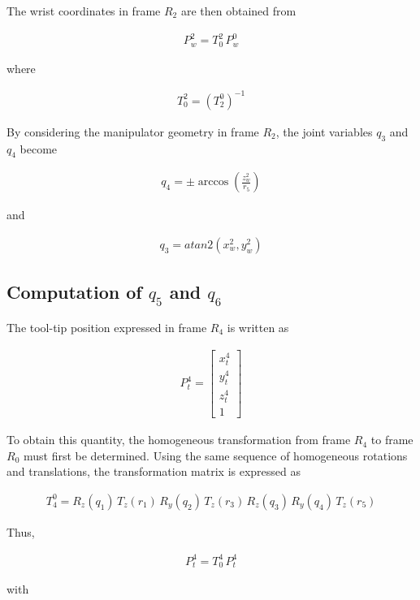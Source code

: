 \documentclass[12pt, a4paper]{article}
\begin{document}
The wrist coordinates in frame \(R_2\) are then obtained from

\begin{align}
P_w^{2} = T_{0}^{2}\,P_w^{0}
\end{align}

where

\begin{align}
T_{0}^{2} = (T_{2}^{0})^{-1}
\end{align}

By considering the manipulator geometry in frame \(R_2\), the joint variables \(q_3\) and \(q_4\) become

\begin{align}
q_4 = \pm \arccos\left(\frac{z_w^{2}}{r_5}\right)
\end{align}

and

\begin{align}
q_3 = atan2\left({x_w^{2}}, {y_w^{2}}\right)
\end{align}

\subsection{Computation of \(q_5\) and \(q_6\)}

The tool-tip position expressed in frame \(R_4\) is written as

\begin{align}
P_t^{4} =
\begin{bmatrix}
x_t^{4}\\
y_t^{4}\\
z_t^{4}\\
1
\end{bmatrix}
\end{align}

To obtain this quantity, the homogeneous transformation from frame \(R_4\) to frame \(R_0\) must first be determined. Using the same sequence of homogeneous rotations and translations, the transformation matrix is expressed as

\begin{align}
T_{4}^{0}
=
R_z(q_1)\,
T_z(r_1)\,
R_y(q_2)\,
T_z(r_3)\,
R_z(q_3)\,
R_y(q_4)\,
T_z(r_5)
\end{align}

Thus,

\begin{align}
P_t^{4} = T_0^{4}\,P_t^{4}
\end{align}

with
\end{document}
